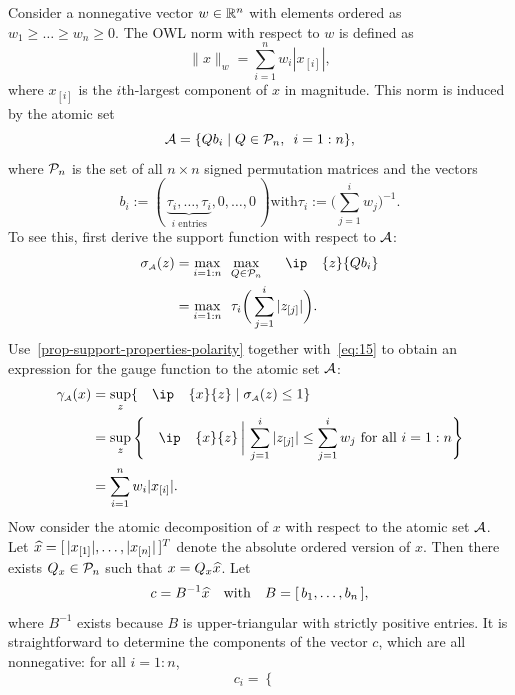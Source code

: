 \begin{example}
  Consider a nonnegative vector $w \in \mathbb{R}^n$ with elements ordered as $w_1
  \geq \dots \geq w_n \geq 0$. The OWL norm with respect to $w$ is defined as 
  \begin{equation*}
    \|x\|_w = \sum_{i = 1}^n w_i|x_{[i]}|,
  \end{equation*}
  where $x_{[i]}$ is the $i$th-largest component of $x$ in magnitude. This norm
  is induced by the atomic set 
  \[
    \mathcal{A} = \{Qb_i \mid Q \in \mathcal{P}_n, \enspace i = 1:n\},
  \]
  where $\mathcal{P}_n$ is the set of all $n\times n$ signed permutation matrices and
  the vectors
  \[
    b_i :=
    (\,\underbrace{\tau_i, \dots, \tau_i}_{\mbox{$i$ entries}}, 0, \dots, 0\,)
    \text{with}
    \tau_i := \bigg(\sum_{j = 1}^i w_j\bigg)^{-1}.
  \]
  To see this, first derive the support function with respect to $\mathcal{A}$:
  \begin{align*}
    \sigma\As(z) &= \max_{i = 1:n}\enspace\max_{Q \in \Pscr_n}\enspace\ip{z}{Qb_i}
    \\&= \max_{i = 1:n}\enspace\tau_i\bigg(\sum_{j = 1}^i |z_{[j]}| \bigg).
  \end{align*}
  Use~\autoref{prop-support-properties-polarity} together with~\eqref{eq:15} to
  obtain an expression for the gauge function to the atomic set $\mathcal{A}$: 
  \begin{align*}
    \gauge\As(x)
      &= \sup_z\{\ip{x}{z} \mid \sigma\As(z) \leq 1\}
    \\&=  \sup_z\Bigg\{
            \ip{x}{z} \,\bigg\vert\, \sum_{j = 1}^i |z_{[j]}| \leq \sum_{j = 1}^i w_j \mbox{ for all } i=1:n
            \Bigg\}
    \\&= \sum_{i = 1}^n w_i|x_{[i]}|.
  \end{align*}
  Now consider the atomic decomposition of $x$ with respect to the atomic set
  $\mathcal{A}$. Let $\xhat = [\,|x_{[1]}|, \dots, |x_{[n]}|\,]^T$ denote the absolute
  ordered version of $x$. Then there exists $Q_x \in \mathcal{P}_n$ such that $x =
  Q_x\xhat$. Let
  \[
    c = B^{-1}\xhat \text{with} B = [\,b_1, \dots, b_n\,],
  \]
  where $B^{-1}$ exists because $B$ is upper-triangular with strictly positive
  entries. It is straightforward to determine the components of the vector $c$,
  which are all nonnegative: for all $i=1:n$,
  \begin{equation} \label{eq:ci-defn}
    c_i =
    \begin{cases}

\end{cases}
\end{equation}
\end{example}
